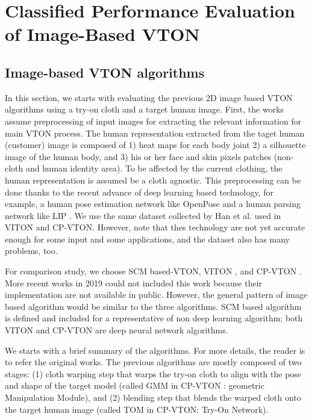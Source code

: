 
\section{Classified Performance Evaluation of Image-Based VTON} \label{section_comparsion}

\subsection{Image-based VTON algorithms}

In this section, we starts with evaluating the previous 2D image based VTON algorithms using a try-on cloth and a target human image. First, the works assume preprocessing of input images for extracting the relevant information for main VTON process. The human representation extracted from the taget human (customer) image is composed of 1) heat maps for each body joint 2) a silhouette image of the human body, and 3) his or her face and skin pixels patches (non-cloth and human identity area). To be affected by the current clothing, the human representation is assumed be a cloth agnostic. This preprocessing can be done thanks to the recent advance of deep learning based technology, for example, a human pose estimation network like OpenPose\cite{Cao2018OpenPoseRM} and a human parsing network like LIP \cite{Liang2018LookIP}. We use the same dataset collected by Han et al. used in VITON\cite{Han2017VITONAI} and CP-VTON\cite{Wang2018TowardCI}. However, note that thes technology are not yet accurate enough for some input and some applications, and the dataset also has many problems, too. 


For comparison study, we choose SCM\cite{BelongieMP02} based-VTON, VITON \cite{Han2017VITONAI}, and CP-VTON \cite{Wang2018TowardCI}. More recent works in 2019 \cite{Sun2019ImageBasedVT,Yu_2019_ICCV,jae2019viton} could not included this work because their implementation are not  available in public.  However, the general pattern of image based algorithm would be similar to the three algorithms. 
SCM based algorithm is defined and included for a representative of non deep learning algorithm; both VITON and CP-VTON are deep neural network algorithms.



We starts with a brief summary of the algorithms. For more details, the reader is to refer the original works. The previous algorithms are mostly composed of two stages: (1) cloth warping step that warps the try-on cloth to align with the pose and shape of the target model (called GMM in CP-VTON \cite{Wang2018TowardCI}: geometric Manipulation Module), and (2) blending step that blends the warped cloth onto the target human image (called TOM in CP-VTON: Try-On Network). 

